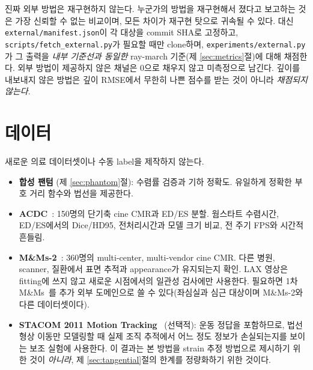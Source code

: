 진짜 외부 방법은 재구현하지 않는다. 누군가의 방법을 재구현해서 졌다고 보고하는 것은
가장 신뢰할 수 없는 비교이며, 모든 차이가 재구현 탓으로 귀속될 수 있다. 대신
\texttt{external/manifest.json}이 각 대상을 commit SHA로 고정하고,
\texttt{scripts/fetch\_external.py}가 필요할 때만 clone하며,
\texttt{experiments/external.py}가 그 출력을 \emph{내부 기준선과 동일한} ray-march
기준(제 \ref{sec:metrics}절)에 대해 채점한다. 외부 방법이 제공하지 않은 채널은
0으로 채우지 않고 미측정으로 남긴다. 깊이를 내보내지 않은 방법은 깊이 RMSE에서
무한히 나쁜 점수를 받는 것이 아니라 \emph{채점되지 않는다}.








\section{데이터}
\label{sec:data}

새로운 의료 데이터셋이나 수동 label을 제작하지 않는다.

\begin{itemize}[leftmargin=2em]
  \item \textbf{합성 팬텀} (제 \ref{sec:phantom}절): 수렴률 검증과 기하 정확도.
  유일하게 정확한 부호 거리 함수와 법선을 제공한다.
  \item \textbf{ACDC}~\citep{bernard2018_acdc}: 150명의 단기축 cine CMR과 ED/ES
  분할. 웜스타트 수렴시간, ED/ES에서의 Dice/HD95, 전처리시간과 모델 크기 비교,
  전 주기 FPS와 시간적 흔들림.
  \item \textbf{M\&Ms-2}~\citep{martinisla2023_mnms2}: 360명의 multi-center,
  multi-vendor cine CMR. 다른 병원, scanner, 질환에서 표면 추적과 appearance가
  유지되는지 확인. LAX 영상은 fitting에 쓰지 않고 새로운 시점에서의 일관성 검사에만
  사용한다. 필요하면 1차 M\&Ms~\citep{campello2021_mnms}를 추가 외부 도메인으로
  쓸 수 있다(좌심실과 심근 대상이며 M\&Ms-2와 다른 데이터셋이다).
  \item \textbf{STACOM 2011 Motion Tracking}~\citep{tobongomez2013_benchmarking}
  (선택적): 운동 정답을 포함하므로, 법선 형상 이동만 모델링할 때 실제 조직 추적에서
  어느 정도 정보가 손실되는지를 보이는 보조 실험에 사용한다. 이 결과는 본 방법을
  strain 추정 방법으로 제시하기 위한 것이 \emph{아니라}, 제
  \ref{sec:tangential}절의 한계를 정량화하기 위한 것이다.
\end{itemize}

